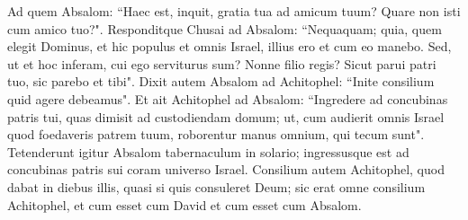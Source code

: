 \begin{biblechapter}
\verse Ad quem Absalom: “Haec est, inquit, gratia tua ad amicum tuum? Quare non isti cum amico tuo?".  
\verse Responditque Chusai ad Absalom: “Nequaquam; quia, quem elegit Dominus, et hic populus et omnis Israel, illius ero et cum eo manebo. 
\verse Sed, ut et hoc inferam, cui ego serviturus sum? Nonne filio regis? Sicut parui patri tuo, sic parebo et tibi". 
\verse Dixit autem Absalom ad Achitophel: “Inite consilium quid agere debeamus".  
\verse Et ait Achitophel ad Absalom: “Ingredere ad concubinas patris tui, quas dimisit ad custodiendam domum; ut, cum audierit omnis Israel quod foedaveris patrem tuum, roborentur manus omnium, qui tecum sunt". 
\verse Tetenderunt igitur Absalom tabernaculum in solario; ingressusque est ad concubinas patris sui coram universo Israel. 
\verse Consilium autem Achitophel, quod dabat in diebus illis, quasi si quis consuleret Deum; sic erat omne consilium Achitophel, et cum esset cum David et cum esset cum Absalom. 
\end{biblechapter}

